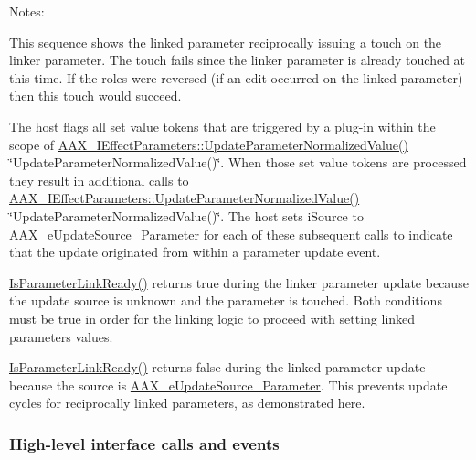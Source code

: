 Notes\+:
\begin{DoxyEnumerate}
\item This sequence shows the linked parameter reciprocally issuing a touch on the linker parameter. The touch fails since the linker parameter is already touched at this time. If the roles were reversed (if an edit occurred on the linked parameter) then this touch would succeed.
\item The host flags all set value tokens that are triggered by a plug-\/in within the scope of \hyperlink{a00061_a685858711efb8634ce66c327f2865c71}{A\+A\+X\+\_\+\+I\+Effect\+Parameters\+::\+Update\+Parameter\+Normalized\+Value()} \char`\"{}\+Update\+Parameter\+Normalized\+Value()\char`\"{}. When those set value tokens are processed they result in additional calls to \hyperlink{a00061_a685858711efb8634ce66c327f2865c71}{A\+A\+X\+\_\+\+I\+Effect\+Parameters\+::\+Update\+Parameter\+Normalized\+Value()} \char`\"{}\+Update\+Parameter\+Normalized\+Value()\char`\"{}. The host sets {\ttfamily i\+Source} to \hyperlink{a00206_a30be0398faf20c6b121239eb9399f3f7a401db669e68d5255c1126f7bf183b7ca}{A\+A\+X\+\_\+e\+Update\+Source\+\_\+\+Parameter} for each of these subsequent calls to indicate that the update originated from within a parameter update event.
\item \hyperlink{a00018_ae105f2a8a00facc2a190ef3ea86c5328}{Is\+Parameter\+Link\+Ready()} returns {\ttfamily true} during the linker parameter update because the update source is unknown and the parameter is touched. Both conditions must be true in order for the linking logic to proceed with setting linked parameters\textquotesingle{} values.
\item \hyperlink{a00018_ae105f2a8a00facc2a190ef3ea86c5328}{Is\+Parameter\+Link\+Ready()} returns {\ttfamily false} during the linked parameter update because the source is \hyperlink{a00206_a30be0398faf20c6b121239eb9399f3f7a401db669e68d5255c1126f7bf183b7ca}{A\+A\+X\+\_\+e\+Update\+Source\+\_\+\+Parameter}. This prevents update cycles for reciprocally linked parameters, as demonstrated here.
\end{DoxyEnumerate}\hypertarget{a00355_linkedParameters_sequences_user_gui_highLevel}{}\subsubsection{High-\/level interface calls and events}\label{a00355_linkedParameters_sequences_user_gui_highLevel}


